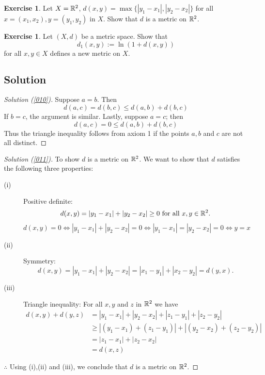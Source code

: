 \documentclass[	DIV=calc,paper=a4,fontsize=11pt]{scrartcl}	 	%
\theoremstyle{definition}
\newtheorem{exer}[thm]{Exercise}
\theoremstyle{plain}
\theoremstyle{remark}
\begin{document}
\begin{exer}\label{012}
Let $X=\Bbb R^2$, $d(x,y)=\max\{|y_1-x_1|,|y_2-x_2|\}$ for all $x=(x_1,x_2),y=(y_1,y_2)$ in $X$. Show that $d$ is a metric on $\Bbb R^2$.
\end{exer}

\begin{exer}\label{013}
Let $(X,d)$ be a metric space. Show that
  \[d_1(x,y):=\ln(1+d(x,y))\]
  for all $x,y\in X$ defines a new metric on $X$.
\end{exer}

\newpage
\subsection*{Solution}
\begin{proof}[Solution (\ref{010})]
Suppose $a=b$. Then
\[d(a,c)=d(b,c)\le d(a,b)+d(b,c)\]
If $b=c$, the argument is similar. Lastly, suppose $a=c$; then
\[d(a,c)=0\le d(a,b)+d(b,c)\]
Thus the triangle inequality follows from axiom 1 if the points $a,b$ and $c$ are not all distinct.
\end{proof}
\begin{proof}[Solution (\ref{011})]
To show $d$ is a metric on $\Bbb R^2$. We want to show that $d$ satisfies the following three properties:
\begin{description}
  \item[(i)] Positive definite:
\[d(x,y) = |y_1-x_1|+ |y_2-x_2|\ge 0 \text{ for all } x,y \in \Bbb R^2.\]
\[d(x,y) = 0 \Leftrightarrow |y_1-x_1| + |y_2-x_2| = 0\Leftrightarrow |y_1-x_1| = |y_2-x_2| = 0\Leftrightarrow y=x\]
  \item[(ii)] Symmetry:
\[d(x,y) = |y_1-x_1|+ |y_2-x_2| = |x_1-y_1|+ |x_2-y_2|=d(y,x).\]
  \item[(iii)] Triangle inequality: For all $x,y$ and $z$ in $\Bbb R^2$ we have
\begin{align*}
d(x,y)+ d(y,z)&=|y_1-x_1|+ |y_2-x_2|+|z_1-y_1|+ |z_2-y_2|\\
              &\ge |(y_1-x_1)+(z_1-y_1)|+ |(y_2-x_2)+ (z_2-y_2)|\\
              &=|z_1-x_1|+|z_2-x_2|\\
              &=d(x,z)
\end{align*}
\end{description}
$\therefore$ Using (i),(ii) and (iii), we conclude that $d$ is a metric on $\Bbb R^2$.
\end{proof}
\end{document}
